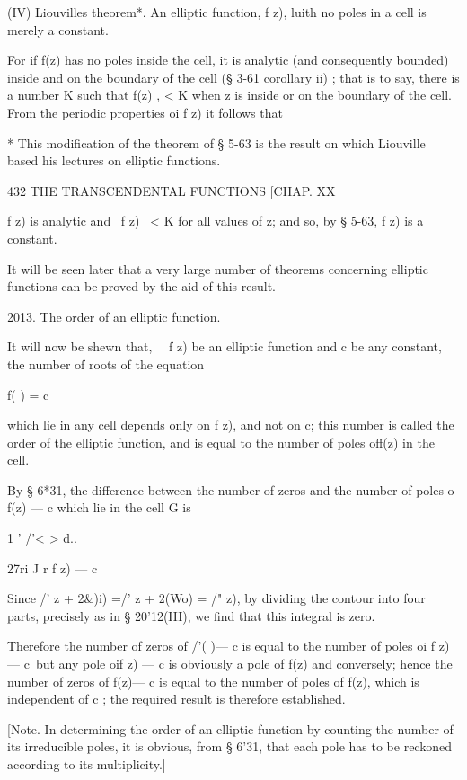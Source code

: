 (IV) Liouvilles theorem*. An elliptic function, f z), luith no poles in a 
cell is merely a constant. 

For if f(z) has no poles inside the cell, it is analytic (and consequently 
bounded) inside and on the boundary of the cell (§ 3-61 corollary ii) ; that is 
to say, there is a number K such that f(z) , < K when z is inside or on the 
boundary of the cell. From the periodic properties oi f z) it follows that 

* This modification of the theorem of § 5-63 is the result on which Liouville based his 
lectures on elliptic functions. 



432 THE TRANSCENDENTAL FUNCTIONS [CHAP. XX 

f z) is analytic and \ f z) \ < K for all values of z; and so, by § 5-63, f z) is 
a constant. 

It will be seen later that a very large number of theorems concerning 
elliptic functions can be proved by the aid of this result. 

2013. The order of an elliptic function. 

It will now be shewn that, \ \   f z) be an elliptic function and c be any 
constant, the number of roots of the equation 

f( ) = c 

which lie in any cell depends only on f z), and not on c; this number is 
called the order of the elliptic function, and is equal to the number of poles 
off(z) in the cell. 

By § 6*31, the difference between the number of zeros and the number 
of poles o f(z) — c which lie in the cell G is 

1 '  /'< > d.. 



27ri J r f z) — c 

Since /'  z + 2\&)i) =/'  z + 2(Wo) = /"  z), by dividing the contour into four 
parts, precisely as in § 20'12(III), we find that this integral is zero. 

Therefore the number of zeros of /'( )— c is equal to the number of 
poles oi f z) — c\ but any pole oif z) — c is obviously a pole of f(z) and 
conversely; hence the number of zeros of f(z)— c is equal to the number 
of poles of f(z), which is independent of c ; the required result is therefore 
established. 

[Note. In determining the order of an elliptic function by counting the number of 
its irreducible poles, it is obvious, from § 6'31, that each pole has to be reckoned according 
to its multiplicity.] 

